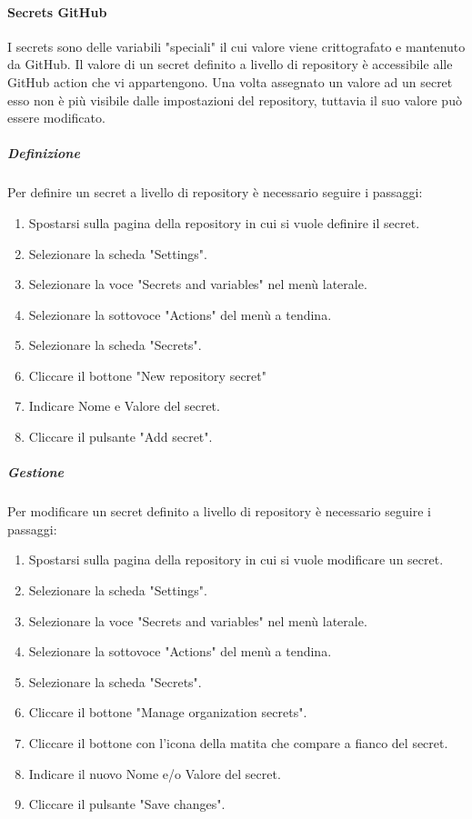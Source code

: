\paragraph{Secrets GitHub}
I secrets sono delle variabili "speciali" il cui valore viene crittografato e mantenuto da GitHub.
Il valore di un secret definito a livello di repository è accessibile alle GitHub action che vi appartengono.
Una volta assegnato un valore ad un secret esso non è più visibile dalle impostazioni del repository, tuttavia il suo valore può essere modificato.

\subparagraph{Definizione}
Per definire un secret a livello di repository è necessario seguire i passaggi:
\begin{enumerate}
    \item Spostarsi sulla pagina della repository in cui si vuole definire il secret.
    \item Selezionare la scheda "Settings".
    \item Selezionare la voce "Secrets and variables" nel menù laterale.
    \item Selezionare la sottovoce "Actions" del menù a tendina.
    \item Selezionare la scheda "Secrets".
    \item Cliccare il bottone "New repository secret" 
    \item Indicare Nome e Valore del secret.
    \item Cliccare il pulsante "Add secret".
\end{enumerate}

\subparagraph{Gestione}
Per modificare un secret definito a livello di repository è necessario seguire i passaggi:
\begin{enumerate}
    \item Spostarsi sulla pagina della repository in cui si vuole modificare un secret.
    \item Selezionare la scheda "Settings".
    \item Selezionare la voce "Secrets and variables" nel menù laterale.
    \item Selezionare la sottovoce "Actions" del menù a tendina.
    \item Selezionare la scheda "Secrets".
    \item Cliccare il bottone "Manage organization secrets".
    \item Cliccare il bottone con l'icona della matita che compare a fianco del secret.
    \item Indicare il nuovo Nome e/o Valore del secret.
    \item Cliccare il pulsante "Save changes".
\end{enumerate}

